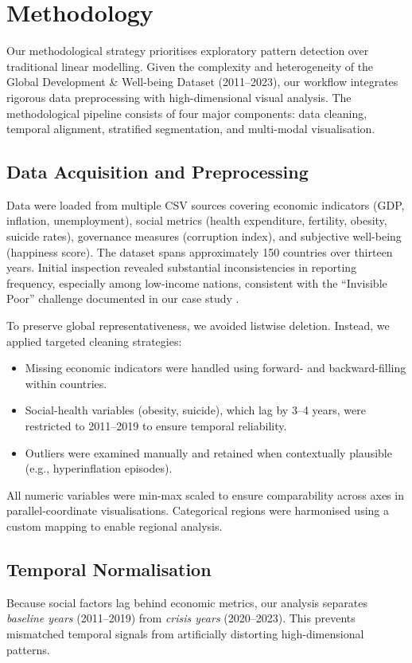 \documentclass[conference]{IEEEtran}
\begin{document}
\section*{Methodology}

Our methodological strategy prioritises exploratory pattern detection over traditional linear modelling. Given the complexity and heterogeneity of the Global Development \& Well-being Dataset (2011--2023), our workflow integrates rigorous data preprocessing with high-dimensional visual analysis. The methodological pipeline consists of four major components: data cleaning, temporal alignment, stratified segmentation, and multi-modal visualisation.

\subsection{Data Acquisition and Preprocessing}
Data were loaded from multiple CSV sources covering economic indicators (GDP, inflation, unemployment), social metrics (health expenditure, fertility, obesity, suicide rates), governance measures (corruption index), and subjective well-being (happiness score). The dataset spans approximately 150 countries over thirteen years. Initial inspection revealed substantial inconsistencies in reporting frequency, especially among low-income nations, consistent with the ``Invisible Poor'' challenge documented in our case study \cite{case_study}.

To preserve global representativeness, we avoided listwise deletion. Instead, we applied targeted cleaning strategies:
\begin{itemize}
    \item Missing economic indicators were handled using forward- and backward-filling within countries.
    \item Social-health variables (obesity, suicide), which lag by 3--4 years, were restricted to 2011--2019 to ensure temporal reliability.
    \item Outliers were examined manually and retained when contextually plausible (e.g., hyperinflation episodes).
\end{itemize}

All numeric variables were min-max scaled to ensure comparability across axes in parallel-coordinate visualisations. Categorical regions were harmonised using a custom mapping to enable regional analysis.

\subsection{Temporal Normalisation}
Because social factors lag behind economic metrics, our analysis separates \emph{baseline years} (2011--2019) from \emph{crisis years} (2020--2023). This prevents mismatched temporal signals from artificially distorting high-dimensional patterns.
\end{document}
